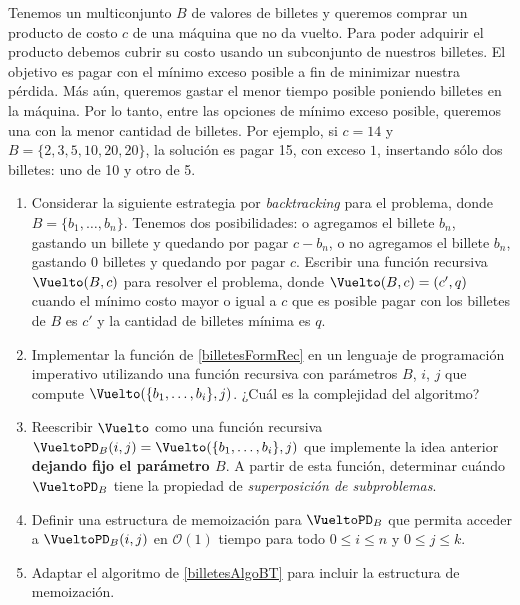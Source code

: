 
\item Tenemos un multiconjunto $B$ de valores de billetes y queremos comprar un producto de costo $c$ de una máquina que no da vuelto.  Para poder adquirir el producto debemos cubrir su costo usando un subconjunto de nuestros billetes. El objetivo es pagar con el mínimo exceso posible a fin de minimizar nuestra pérdida.  Más aún, queremos gastar el menor tiempo posible poniendo billetes en la máquina. Por lo tanto, entre las opciones de mínimo exceso posible, queremos una con la menor cantidad de billetes. Por ejemplo, si $c = 14$ y $B = \{2, 3, 5, 10, 20, 20\}$, la solución es pagar 15, con exceso $1$, insertando sólo dos billetes: uno de 10 y otro de 5.

\begin{enumerate}[label=$\alph*)$,ref=$\alph*)$]
 \item Considerar la siguiente estrategia por \textit{backtracking} para el problema, donde $B = \{b_1, \ldots, b_n\}$. Tenemos dos posibilidades: o agregamos el billete $b_n$, gastando un billete y quedando por pagar $c-b_n$, o no agregamos el billete $b_n$, gastando $0$ billetes y quedando por pagar $c$.  Escribir una función recursiva $\Vuelto(B, c)$ para resolver el problema, donde $\Vuelto(B, c) = (c', q)$ cuando el mínimo costo mayor o igual a $c$ que es posible pagar con los billetes de $B$ es $c'$ y la cantidad de billetes mínima es $q$.
\label{billetesFormRec}

 \item Implementar la función de \ref{billetesFormRec} en un lenguaje de programación imperativo utilizando una función recursiva con parámetros $B$, $i$, $j$ que compute $\Vuelto(\{b_1, \ldots, b_i\}, j)$.  ¿Cuál es la complejidad del algoritmo?
 \label{billetesAlgoBT}

 \item Reescribir $\Vuelto$ como una función recursiva $\VueltoPD_B(i, j) = \Vuelto(\{b_1, \ldots, b_i\}, j)$ que implemente la idea anterior \textbf{dejando fijo el parámetro $B$}.  A partir de esta función, determinar cuándo $\VueltoPD_B$ tiene la propiedad de \emph{superposición de subproblemas}.

 \item Definir una estructura de memoización para $\VueltoPD_B$ que permita acceder a $\VueltoPD_B(i, j)$ en $\mathcal{O}(1)$ tiempo para todo $0 \leq i \leq n$ y $0 \leq j \leq k$.

 \item Adaptar el algoritmo de \ref{billetesAlgoBT} para incluir la estructura de memoización.


\end{enumerate}
